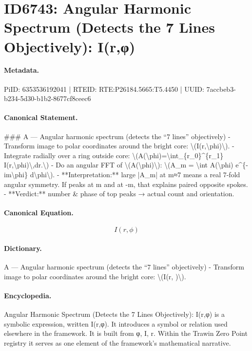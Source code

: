 \section*{ID6743: Angular Harmonic Spectrum (Detects the 7 Lines Objectively): I(r,φ)}
\paragraph{Metadata.}
PiID: 6353536192041 | RTEID: RTE:P26184.5665:T5.4450 | UUID: 7accbeb3-b234-5d30-b1b2-8677cf8ceec6

\paragraph{Canonical Statement.}
\#\#\# A — Angular harmonic spectrum (detects the “7 lines” objectively) - Transform image to polar coordinates around the bright core: \textbackslash{}(I(r,\textbackslash{}phi)\textbackslash{}). - Integrate radially over a ring outside core: \textbackslash{}(A(\textbackslash{}phi)=\textbackslash{}int\_\{r\_0\}\textasciicircum{}\{r\_1\} I(r,\textbackslash{}phi)\textbackslash{},dr.\textbackslash{}) - Do an angular FFT of \textbackslash{}(A(\textbackslash{}phi)\textbackslash{}): \textbackslash{}(A\_m = \textbackslash{}int A(\textbackslash{}phi) e\textasciicircum{}\{-im\textbackslash{}phi\} d\textbackslash{}phi\textbackslash{}). - **Interpretation:** large |A\_m| at m≈7 means a real 7-fold angular symmetry. If peaks at m and at -m, that explains paired opposite spokes. - **Verdict:** number \& phase of top peaks → actual count and orientation.

\paragraph{Canonical Equation.}
\[
I(r,\phi)
\]

\paragraph{Dictionary.}
A — Angular harmonic spectrum (detects the “7 lines” objectively) - Transform image to polar coordinates around the bright core: \textbackslash{}(I(r, )\textbackslash{}).

\paragraph{Encyclopedia.}
Angular Harmonic Spectrum (Detects the 7 Lines Objectively): I(r,φ) is a symbolic expression, written I(r,φ). It introduces a symbol or relation used elsewhere in the framework. It is built from φ, I, r. Within the Trawin Zero Point registry it serves as one element of the framework's mathematical narrative.
